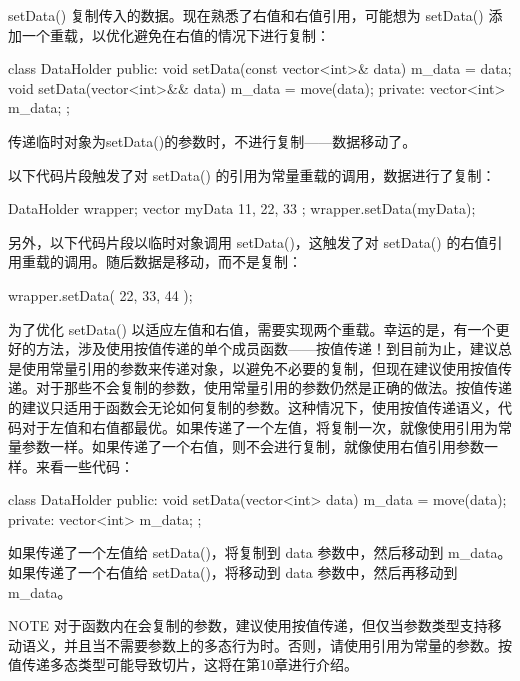 setData() 复制传入的数据。现在熟悉了右值和右值引用，可能想为 setData() 添加一个重载，以优化避免在右值的情况下进行复制：

\begin{cpp}
class DataHolder
{
    public:
        void setData(const vector<int>& data) { m_data = data; }
        void setData(vector<int>&& data) { m_data = move(data); }
    private:
        vector<int> m_data;
};
\end{cpp}

传递临时对象为setData()的参数时，不进行复制——数据移动了。

以下代码片段触发了对 setData() 的引用为常量重载的调用，数据进行了复制：

\begin{cpp}
DataHolder wrapper;
vector myData { 11, 22, 33 };
wrapper.setData(myData);
\end{cpp}

另外，以下代码片段以临时对象调用 setData()，这触发了对 setData() 的右值引用重载的调用。随后数据是移动，而不是复制：

\begin{cpp}
wrapper.setData({ 22, 33, 44 });
\end{cpp}

为了优化 setData() 以适应左值和右值，需要实现两个重载。幸运的是，有一个更好的方法，涉及使用按值传递的单个成员函数——按值传递！到目前为止，建议总是使用常量引用的参数来传递对象，以避免不必要的复制，但现在建议使用按值传递。对于那些不会复制的参数，使用常量引用的参数仍然是正确的做法。按值传递的建议只适用于函数会无论如何复制的参数。这种情况下，使用按值传递语义，代码对于左值和右值都最优。如果传递了一个左值，将复制一次，就像使用引用为常量参数一样。如果传递了一个右值，则不会进行复制，就像使用右值引用参数一样。来看一些代码：

\begin{cpp}
class DataHolder
{
    public:
        void setData(vector<int> data) { m_data = move(data); }
    private:
        vector<int> m_data;
};
\end{cpp}

如果传递了一个左值给 setData()，将复制到 data 参数中，然后移动到 m\_data。如果传递了一个右值给 setData()，将移动到 data 参数中，然后再移动到 m\_data。

\begin{myNotic}{NOTE}
对于函数内在会复制的参数，建议使用按值传递，但仅当参数类型支持移动语义，并且当不需要参数上的多态行为时。否则，请使用引用为常量的参数。按值传递多态类型可能导致切片，这将在第10章进行介绍。
\end{myNotic}

